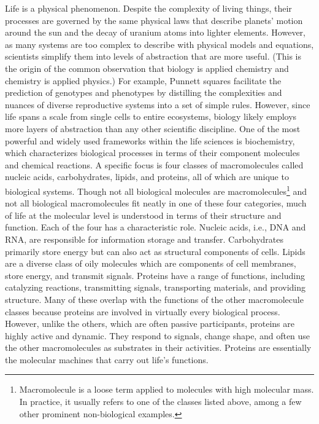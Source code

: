 %
%
Life is a physical phenomenon. Despite the complexity of living things, their processes are governed by the same physical laws that describe planets' motion around the sun and the decay of uranium atoms into lighter elements. However, as many systems are too complex to describe with physical models and equations, scientists simplify them into levels of abstraction that are more useful. (This is the origin of the common observation that biology is applied chemistry and chemistry is applied physics.) For example, Punnett squares facilitate the prediction of genotypes and phenotypes by distilling the complexities and nuances of diverse reproductive systems into a set of simple rules. However, since life spans a scale from single cells to entire ecosystems, biology likely employs more layers of abstraction than any other scientific discipline. One of the most powerful and widely used frameworks within the life sciences is biochemistry, which characterizes biological processes in terms of their component molecules and chemical reactions. A specific focus is four classes of macromolecules called nucleic acids, carbohydrates, lipids, and proteins, all of which are unique to biological systems. Though not all biological molecules are macromolecules\footnote{Macromolecule is a loose term applied to molecules with high molecular mass. In practice, it usually refers to one of the classes listed above, among a few other prominent non-biological examples.} and not all biological macromolecules fit neatly in one of these four categories, much of life at the molecular level is understood in terms of their structure and function. Each of the four has a characteristic role. Nucleic acids, i.e., DNA and RNA, are responsible for information storage and transfer. Carbohydrates primarily store energy but can also act as structural components of cells. Lipids are a diverse class of oily molecules which are components of cell membranes, store energy, and transmit signals. Proteins have a range of functions, including catalyzing reactions, transmitting signals, transporting materials, and providing structure. Many of these overlap with the functions of the other macromolecule classes because proteins are involved in virtually every biological process. However, unlike the others, which are often passive participants, proteins are highly active and dynamic. They respond to signals, change shape, and often use the other macromolecules as substrates in their activities. Proteins are essentially the molecular machines that carry out life's functions.

